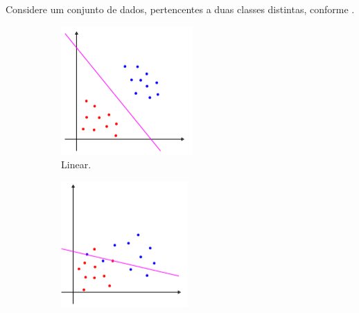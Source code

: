 \documentclass[12pt,a4paper]{scrartcl}
\theoremstyle{definition}%
\begin{document}
Considere um conjunto de dados, pertencentes a duas classes distintas, conforme .

\begin{figure}[!h] 
\centering
\begin{subfigure}[h]{0.3\textwidth}
\centering
\includegraphics[width=\textwidth]{SVM_linear}
\caption{Linear. \label{fig1:a}}
\end{subfigure}
\begin{subfigure}[!h]{0.3\textwidth}
	\centering
	\includegraphics[width=\textwidth]{SVM_flexivel}

\end{subfigure}
\end{figure}
\end{document}
